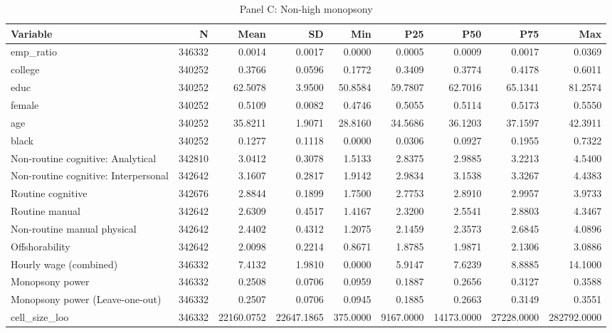 \begin{table}

\caption{Panel C: Non-high monopsony}
\centering
\begin{tabular}[t]{lrrrrrrrr}
\toprule
Variable & N & Mean & SD & Min & P25 & P50 & P75 & Max\\
\midrule
emp\_ratio & 346332 & 0.0014 & 0.0017 & 0.0000 & 0.0005 & 0.0009 & 0.0017 & 0.0369\\
college & 340252 & 0.3766 & 0.0596 & 0.1772 & 0.3409 & 0.3774 & 0.4178 & 0.6011\\
educ & 340252 & 62.5078 & 3.9500 & 50.8584 & 59.7807 & 62.7016 & 65.1341 & 81.2574\\
female & 340252 & 0.5109 & 0.0082 & 0.4746 & 0.5055 & 0.5114 & 0.5173 & 0.5550\\
age & 340252 & 35.8211 & 1.9071 & 28.8160 & 34.5686 & 36.1203 & 37.1597 & 42.3911\\
\addlinespace
black & 340252 & 0.1277 & 0.1118 & 0.0000 & 0.0306 & 0.0927 & 0.1955 & 0.7322\\
Non-routine cognitive: Analytical & 342810 & 3.0412 & 0.3078 & 1.5133 & 2.8375 & 2.9885 & 3.2213 & 4.5400\\
Non-routine cognitive: Interpersonal & 342642 & 3.1607 & 0.2817 & 1.9142 & 2.9834 & 3.1538 & 3.3267 & 4.4383\\
Routine cognitive & 342676 & 2.8844 & 0.1899 & 1.7500 & 2.7753 & 2.8910 & 2.9957 & 3.9733\\
Routine manual & 342642 & 2.6309 & 0.4517 & 1.4167 & 2.3200 & 2.5541 & 2.8803 & 4.3467\\
\addlinespace
Non-routine manual physical & 342642 & 2.4402 & 0.4312 & 1.2075 & 2.1459 & 2.3573 & 2.6845 & 4.0896\\
Offshorability & 342642 & 2.0098 & 0.2214 & 0.8671 & 1.8785 & 1.9871 & 2.1306 & 3.0886\\
Hourly wage (combined) & 346332 & 7.4132 & 1.9810 & 0.0000 & 5.9147 & 7.6239 & 8.8885 & 14.1000\\
Monopsony power & 346332 & 0.2508 & 0.0706 & 0.0959 & 0.1887 & 0.2656 & 0.3127 & 0.3588\\
Monopsony power (Leave-one-out) & 346332 & 0.2507 & 0.0706 & 0.0945 & 0.1885 & 0.2663 & 0.3149 & 0.3551\\
\addlinespace
cell\_size\_loo & 346332 & 22160.0752 & 22647.1865 & 375.0000 & 9167.0000 & 14173.0000 & 27228.0000 & 282792.0000\\
\bottomrule
\end{tabular}
\end{table}
